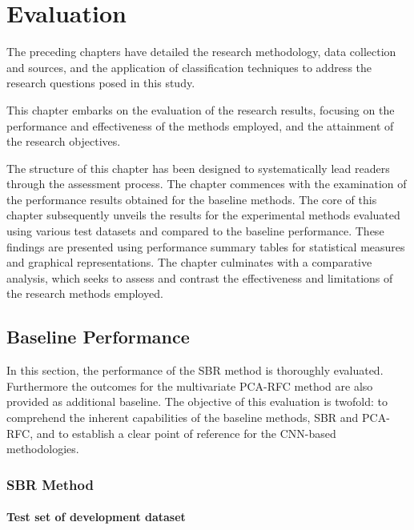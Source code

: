 \section{Evaluation}
\label{sec:evaluation}

The preceding chapters have detailed the research methodology, data collection and sources, and the application of classification techniques 
to address the research questions posed in this study. 

This chapter embarks on the evaluation of the research results, focusing on the performance and effectiveness of the methods employed, 
and the attainment of the research objectives.

The structure of this chapter has been designed to systematically lead readers through the assessment process. 
The chapter commences with the examination of the performance results obtained for the baseline methods.
The core of this chapter subsequently unveils the results 
for the experimental methods evaluated using various test datasets and compared to the baseline performance.
These findings are presented using performance summary tables for statistical measures and graphical representations.
The chapter culminates with a comparative analysis, which seeks to assess and contrast the effectiveness and 
limitations of the research methods employed.

\subsection{Baseline Performance}
\label{subsec:baseline_performance}

In this section, the performance of the SBR method is thoroughly evaluated. 
Furthermore the outcomes for the multivariate PCA-RFC method are also provided as additional baseline.
The objective of this evaluation is twofold: to comprehend the inherent capabilities of the baseline methods, SBR and
PCA-RFC, and to establish a clear point of reference for the CNN-based methodologies.

\subsubsection{SBR Method}
\label{subsubsec:eval_sbr}


\paragraph{Test set of development dataset}

